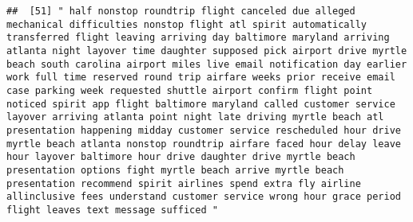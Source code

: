 \documentclass[
]{article}
\begin{document}
\begin{verbatim}
##  [51] " half nonstop roundtrip flight canceled due alleged mechanical difficulties nonstop flight atl spirit automatically transferred flight leaving arriving day baltimore maryland arriving atlanta night layover time daughter supposed pick airport drive myrtle beach south carolina airport miles live email notification day earlier work full time reserved round trip airfare weeks prior receive email case parking week requested shuttle airport confirm flight point noticed spirit app flight baltimore maryland called customer service layover arriving atlanta point night late driving myrtle beach atl presentation happening midday customer service rescheduled hour drive myrtle beach atlanta nonstop roundtrip airfare faced hour delay leave hour layover baltimore hour drive daughter drive myrtle beach presentation options fight myrtle beach arrive myrtle beach presentation recommend spirit airlines spend extra fly airline allinclusive fees understand customer service wrong hour grace period flight leaves text message sufficed "                                                                                                                                                                                                                                                                                                                                                                                                                                                                                                                                                                                                                                                                                                                           

\end{verbatim}
\end{document}
